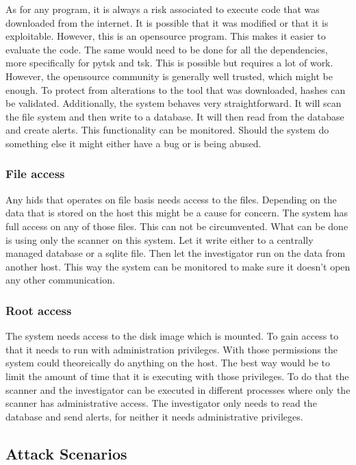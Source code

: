 As for any program, it is always a risk associated to execute code that was downloaded from the internet. It is possible that it was modified or that it is exploitable. However, this is an \gls{opensource} program. This makes it easier to evaluate the code. The same would need to be done for all the dependencies, more specifically for \gls{pytsk} and \gls{tsk}. This is possible but requires a lot of work. However, the \gls{opensource} community is generally well trusted, which might be enough. To protect from alterations to the tool that was downloaded, hashes can be validated. Additionally, the system behaves very straightforward. It will scan the file system and then write to a database. It will then read from the database and create alerts. This functionality can be monitored. Should the system do something else it might either have a bug or is being abused.

\subsubsection{File access}
\label{sec:risk:file}

Any \gls{hids} that operates on file basis needs access to the files. Depending on the data that is stored on the host this might be a cause for concern. The system has full access on any of those files. This can not be circumvented. What can be done is using only the scanner on this system. Let it write either to a centrally managed database or a sqlite file. Then let the investigator run on the data from another host. This way the system can be monitored to make sure it doesn't open any other communication.

\subsubsection{Root access}
\label{sec:risk:root}

The system needs access to the disk image which is mounted. To gain access to that it needs to run with administration privileges. With those permissions the system could theoreically do anything on the host. The best way would be to limit the amount of time that it is executing with those privileges. To do that the scanner and the investigator can be executed in different processes where only the scanner has administrative access. The investigator only needs to read the database and send alerts, for neither it needs administrative privileges.

\subsection{Attack Scenarios}
\label{sec:attack_scenarios}

